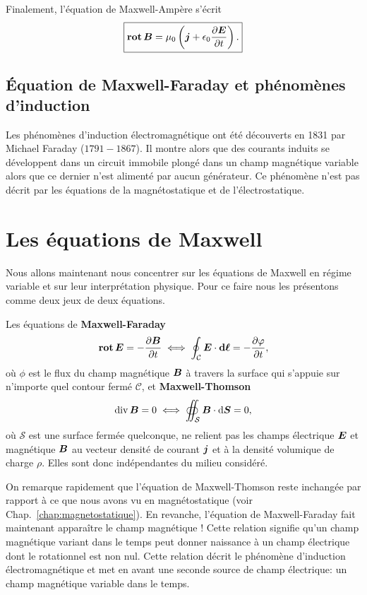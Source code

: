 Finalement, l'équation de Maxwell-Ampère s'écrit
\begin{equation}
	\boxed{\rot \vecb = \mu_0 \left( \vecj + \epsilon_0 \dd{\vece}{t} \right).}
\end{equation}
\subsection{Équation de Maxwell-Faraday et phénomènes d'induction}
Les phénomènes d'induction électromagnétique ont été découverts en 1831
par Michael Faraday ($1791-1867$). Il montre alors que des courants induits 
se développent dans un 
circuit immobile plongé dans un champ magnétique variable alors que ce dernier
n'est alimenté par aucun générateur. Ce phénomène n'est pas décrit par
les équations de la magnétostatique et de l'électrostatique.

\section{Les équations de Maxwell}
Nous allons maintenant nous concentrer sur les équations de Maxwell en régime 
variable et sur leur interprétation physique. Pour ce faire nous les
présentons comme deux jeux de deux équations.

\begin{defn}
	Les équations de \textbf{Maxwell-Faraday}
	\begin{equation}
		\rot \vece = - \dd{\vecb}{t} \iff \oint_\mathcal{C} \vece 
		\cdot \dl = - \dd{\phi}{t},
	\end{equation}
	où $\phi$ est le flux du champ magnétique $\vecb$ à travers la 
	surface qui s'appuie sur n'importe quel contour fermé $\mathcal{C}$, 
	et \textbf{Maxwell-Thomson}
	\begin{equation}
		\div \vecb = 0 \iff \oiint_\mathcal{S} \vecb \cdot \ds = 0,
	\end{equation}
	où $\mathcal{S}$ est une surface fermée quelconque, ne relient pas les champs 
	électrique $\vece$ et magnétique $\vecb$
	au vecteur densité de courant $\vecj$ et à la densité volumique de 
	charge $\rho$. Elles sont donc indépendantes du milieu considéré.
\end{defn}

On remarque rapidement que l'équation de Maxwell-Thomson reste inchangée par rapport
à ce que nous avons vu en magnétostatique (voir Chap.~\ref{chap:magnetostatique}).
En revanche, l'équation de Maxwell-Faraday fait maintenant apparaître le
champ magnétique ! Cette relation signifie
qu'un champ magnétique variant dans le temps peut donner naissance à un champ électrique
dont le rotationnel est non nul. Cette relation décrit le phénomène d'induction 
électromagnétique et met en avant une seconde source de champ électrique: 
un champ magnétique variable dans le temps. 

